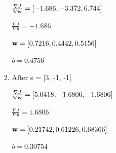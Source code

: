 \documentclass[12pt, fullpage,letterpaper]{article}
\begin{document}
\begin{enumerate}
\begin{enumerate}
\begin{enumerate}
		$\frac{\nabla J}{\nabla {\bf w}} = [-1.686, -3.372, 6.744]$
		
		$\frac{\nabla J}{\nabla b} = -1.686$
		
		${\bf w} = [0.7216, 0.4442, 0.5156]$
		
		$b = 0.4756$
		\item After s = [3, -1, -1]
		
		$\frac{\nabla J}{\nabla {\bf w}} = [5.0418, -1.6806, -1.6806]$
		
		$\frac{\nabla J}{\nabla b} = 1.6806$
		
		${\bf w} = [0.21742, 0.61226, 0.68366]$
		
		$b = 0.30754$
	\end{enumerate}
	
\end{enumerate}
\end{enumerate}
\end{document}
